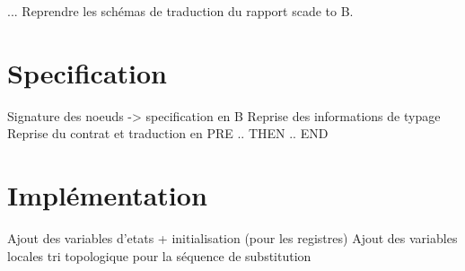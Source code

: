 

...
Reprendre les schémas de traduction du rapport scade to B.

\section{Specification}
Signature des noeuds -> specification en B
Reprise des informations de typage
Reprise du contrat et traduction en PRE .. THEN .. END


\section{Implémentation}
Ajout des variables d'etats + initialisation (pour les registres)
Ajout des variables locales
tri topologique pour la séquence de substitution

